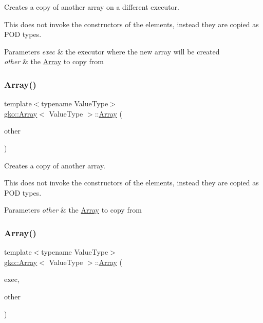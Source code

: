 Creates a copy of another array on a different executor. 

This does not invoke the constructors of the elements, instead they are copied as P\+OD types.


\begin{DoxyParams}{Parameters}
{\em exec} & the executor where the new array will be created \\
\hline
{\em other} & the \hyperlink{classgko_1_1Array}{Array} to copy from \\
\hline
\end{DoxyParams}
\mbox{\label{classgko_1_1Array_ab5c0cdf59d9920d0f72f4018a5e4a8ab}} 
\subsubsection{\texorpdfstring{Array()}{Array()}\hspace{0.1cm}{\footnotesize\ttfamily [9/11]}}
{\footnotesize\ttfamily template$<$typename Value\+Type$>$ \\
\hyperlink{classgko_1_1Array}{gko\+::\+Array}$<$ Value\+Type $>$\+::\hyperlink{classgko_1_1Array}{Array} (\begin{DoxyParamCaption}\item[{const \hyperlink{classgko_1_1Array}{Array}$<$ Value\+Type $>$ \&}]{other }\end{DoxyParamCaption})}



Creates a copy of another array. 

This does not invoke the constructors of the elements, instead they are copied as P\+OD types.


\begin{DoxyParams}{Parameters}
{\em other} & the \hyperlink{classgko_1_1Array}{Array} to copy from \\
\hline
\end{DoxyParams}
\mbox{\label{classgko_1_1Array_a7e5b32002ac86e0534b91a4808212e28}} 
\subsubsection{\texorpdfstring{Array()}{Array()}\hspace{0.1cm}{\footnotesize\ttfamily [10/11]}}
{\footnotesize\ttfamily template$<$typename Value\+Type$>$ \\
\hyperlink{classgko_1_1Array}{gko\+::\+Array}$<$ Value\+Type $>$\+::\hyperlink{classgko_1_1Array}{Array} (\begin{DoxyParamCaption}\item[{std\+::shared\+\_\+ptr$<$ const \hyperlink{classgko_1_1Executor}{Executor} $>$}]{exec,  }\item[{\hyperlink{classgko_1_1Array}{Array}$<$ Value\+Type $>$ \&\&}]{other }\end{DoxyParamCaption})}



